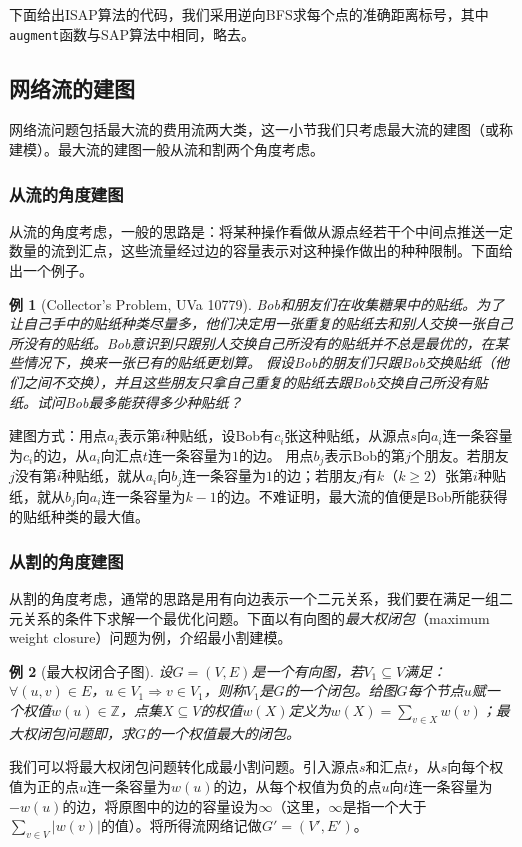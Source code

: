 \documentclass[a4paper]{ctexbook}
\newtheorem{example}{例}[chapter]
\begin{document}
  下面给出ISAP算法的代码，我们采用逆向BFS求每个点的准确距离标号，其中\texttt{augment}函数与SAP算法中相同，略去。
  
  \subsection{网络流的建图}
  网络流问题包括最大流的费用流两大类，这一小节我们只考虑最大流的建图（或称建模）。最大流的建图一般从流和割两个角度考虑。
  \subsubsection{从流的角度建图}
  从流的角度考虑，一般的思路是：将某种操作看做从源点经若干个中间点推送一定数量的流到汇点，这些流量经过边的容量表示对这种操作做出的种种限制。下面给出一个例子。
  \begin{example}[Collector's Problem, UVa 10779]
    Bob和朋友们在收集糖果中的贴纸。为了让自己手中的贴纸种类尽量多，他们决定用一张重复的贴纸去和别人交换一张自己所没有的贴纸。Bob意识到只跟别人交换自己所没有的贴纸并不总是最优的，在某些情况下，换来一张已有的贴纸更划算。
    假设Bob的朋友们只跟Bob交换贴纸（他们之间不交换），并且这些朋友只拿自己重复的贴纸去跟Bob交换自己所没有贴纸。试问Bob最多能获得多少种贴纸？
  \end{example}
  建图方式：用点$a_i$表示第$i$种贴纸，设Bob有$c_i$张这种贴纸，从源点$s$向$a_i$连一条容量为$c_i$的边，从$a_i$向汇点$t$连一条容量为$1$的边。
  用点$b_j$表示Bob的第$j$个朋友。若朋友$j$没有第$i$种贴纸，就从$a_i$向$b_j$连一条容量为$1$的边；若朋友$j$有$k$（$k\ge 2$）张第$i$种贴纸，就从$b_j$向$a_i$连一条容量为$k-1$的边。不难证明，最大流的值便是Bob所能获得的贴纸种类的最大值。
  \subsubsection*{从割的角度建图}
  从割的角度考虑，通常的思路是用有向边表示一个二元关系，我们要在满足一组二元关系的条件下求解一个最优化问题。下面以有向图的\emph{最大权闭包}（maximum weight closure）问题为例，介绍最小割建模。
  \begin{example}[最大权闭合子图]
  设$G=(V,E)$是一个有向图，若$V_1\subseteq V$满足：$\forall (u,v) \in E$，$u\in V_1 \Rightarrow v\in V_1$，则称$V_1$是$G$的一个闭包。给图$G$每个节点$u$赋一个权值$w(u)\in \mathbb{Z}$，点集$X\subseteq V$的权值$w(X)$定义为$w(X)=\sum_{v\in X}w(v)$；最大权闭包问题即，求$G$的一个权值最大的闭包。
\end{example}
  我们可以将最大权闭包问题转化成最小割问题。引入源点$s$和汇点$t$，从$s$向每个权值为正的点$u$连一条容量为$w(u)$的边，从每个权值为负的点$u$向$t$连一条容量为$-w(u)$的边，将原图中的边的容量设为$\infty$（这里，$\infty$是指一个大于$\sum_{v\in V}|w(v)|$的值）。将所得流网络记做$G'=(V',E')$。
\end{document}
